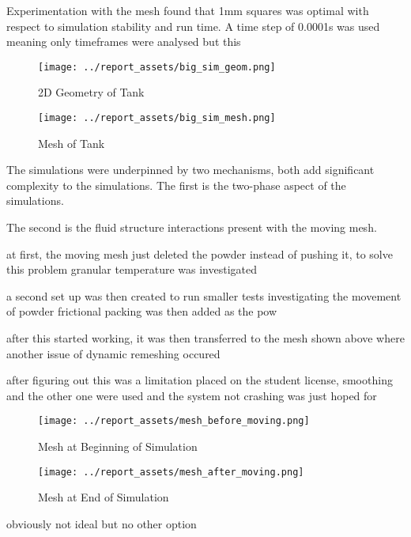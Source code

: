 Experimentation with the mesh found that 1mm squares was optimal with respect to simulation stability and run time. A time step of 0.0001s was used meaning only timeframes were analysed but this 
\begin{figure}[htbp]
    \centering

    \begin{minipage}{0.45\textwidth}
        \centering
        \texttt{[image: ../report\_assets/big\_sim\_geom.png]}
        \caption{2D Geometry of Tank}\label{fig:2D-tank}
    \end{minipage}
    \hfill
    \begin{minipage}{0.45\textwidth}
        \centering
        \texttt{[image: ../report\_assets/big\_sim\_mesh.png]}
        \caption{Mesh of Tank}\label{fig:mesh-tank}
    \end{minipage}

\end{figure}
The simulations were underpinned by two mechanisms, both add significant complexity to the simulations. The first is the two-phase aspect of the simulations. 

The second is the fluid structure interactions present with the moving mesh.


at first, the moving mesh just deleted the powder instead of pushing it, to solve this problem
granular temperature was investigated

a second set up was then created to run smaller tests investigating the movement of powder
frictional packing was then added as the pow

after this started working, it was then transferred to the mesh shown above where another issue of dynamic remeshing occured

after figuring out this was a limitation placed on the student license, smoothing and the other one were used and the system not crashing was just hoped for

\begin{figure}[htbp]
    \centering

    \begin{minipage}{0.45\textwidth}
        \centering
        \texttt{[image: ../report\_assets/mesh\_before\_moving.png]}
        \caption{Mesh at Beginning of Simulation}\label{fig:2D-tank}
    \end{minipage}
    \hfill
    \begin{minipage}{0.45\textwidth}
        \centering
        \texttt{[image: ../report\_assets/mesh\_after\_moving.png]}
        \caption{Mesh at End of Simulation}\label{fig:mesh-tank}
    \end{minipage}

\end{figure}
obviously not ideal but no other option

